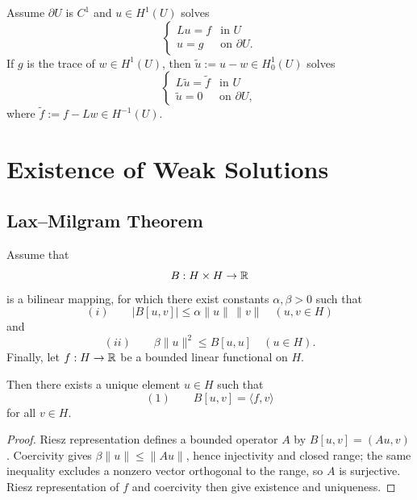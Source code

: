 \begin{remark}
\label{rem:nonzero-boundary-weak-solution}

Assume $\partial U$ is $C^1$ and $u\in H^1(U)$ solves
$$\begin{cases} Lu = f & \text{in } U \\ u = g & \text{on } \partial U. \end{cases}$$
If $g$ is the trace of $w\in H^1(U)$, then $\tilde u:=u-w\in H_0^1(U)$ solves
$$\begin{cases} L\tilde u = \tilde f & \text{in } U \\ \tilde u = 0 & \text{on } \partial U, \end{cases}$$
where $\tilde f := f - Lw \in H^{-1}(U)$.
\end{remark}

\section{Existence of Weak Solutions}
\label{sec:existence-of-weak-solutions}

\subsection{Lax--Milgram Theorem}

\begin{theorem}
\label{thm:lax-milgram-theorem}
Assume that
$$B : H \times H \to \mathbb{R}$$
is a bilinear mapping, for which there exist constants $\alpha,\beta > 0$ such that
$$(i) \qquad |B[u,v]| \leq \alpha\|u\| \, \|v\| \quad (u,v \in H)$$
and
$$(ii) \qquad \beta\|u\|^2 \leq B[u,u] \quad (u \in H).$$
Finally, let $f : H \to \mathbb{R}$ be a bounded linear functional on $H$.

Then there exists a unique element $u \in H$ such that
$$(1) \qquad B[u,v] = \langle f,v \rangle$$
for all $v \in H$.
\end{theorem}

\begin{proof}
\sketch Riesz representation defines a bounded operator $A$ by $B[u,v]=(Au,v)$. Coercivity gives $\beta\|u\|\le\|Au\|$, hence injectivity and closed range; the same inequality excludes a nonzero vector orthogonal to the range, so $A$ is surjective. Riesz representation of $f$ and coercivity then give existence and uniqueness.
\end{proof}


